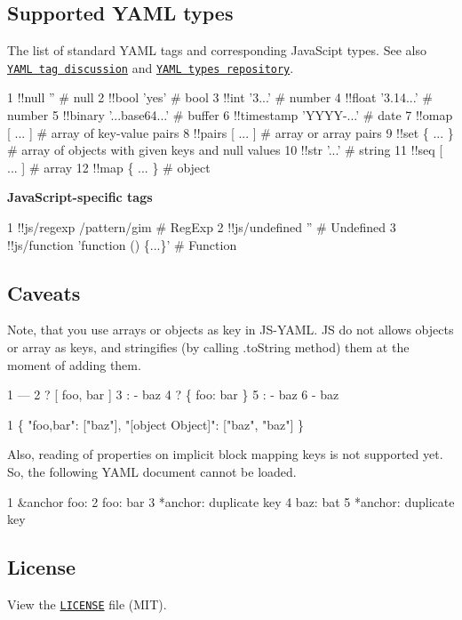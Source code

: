 \subsection*{Supported Y\+A\+M\+L types }

The list of standard Y\+A\+M\+L tags and corresponding Java\+Scipt types. See also \href{http://pyyaml.org/wiki/YAMLTagDiscussion}{\tt Y\+A\+M\+L tag discussion} and \href{http://yaml.org/type/}{\tt Y\+A\+M\+L types repository}.


\begin{DoxyCode}
1 !!null ''                   # null
2 !!bool 'yes'                # bool
3 !!int '3...'                # number
4 !!float '3.14...'           # number
5 !!binary '...base64...'     # buffer
6 !!timestamp 'YYYY-...'      # date
7 !!omap [ ... ]              # array of key-value pairs
8 !!pairs [ ... ]             # array or array pairs
9 !!set \{ ... \}               # array of objects with given keys and null values
10 !!str '...'                 # string
11 !!seq [ ... ]               # array
12 !!map \{ ... \}               # object
\end{DoxyCode}


{\bfseries Java\+Script-\/specific tags}


\begin{DoxyCode}
1 !!js/regexp /pattern/gim            # RegExp
2 !!js/undefined ''                   # Undefined
3 !!js/function 'function () \{...\}'   # Function
\end{DoxyCode}


\subsection*{Caveats}

Note, that you use arrays or objects as key in J\+S-\/\+Y\+A\+M\+L. J\+S do not allows objects or array as keys, and stringifies (by calling .to\+String method) them at the moment of adding them.


\begin{DoxyCode}
1 ---
2 ? [ foo, bar ]
3 : - baz
4 ? \{ foo: bar \}
5 : - baz
6   - baz
\end{DoxyCode}



\begin{DoxyCode}
1 \{ "foo,bar": ["baz"], "[object Object]": ["baz", "baz"] \}
\end{DoxyCode}


Also, reading of properties on implicit block mapping keys is not supported yet. So, the following Y\+A\+M\+L document cannot be loaded.


\begin{DoxyCode}
1 &anchor foo:
2   foo: bar
3   *anchor: duplicate key
4   baz: bat
5   *anchor: duplicate key
\end{DoxyCode}


\subsection*{License}

View the \href{https://github.com/nodeca/js-yaml/blob/master/LICENSE}{\tt L\+I\+C\+E\+N\+S\+E} file (M\+I\+T). 